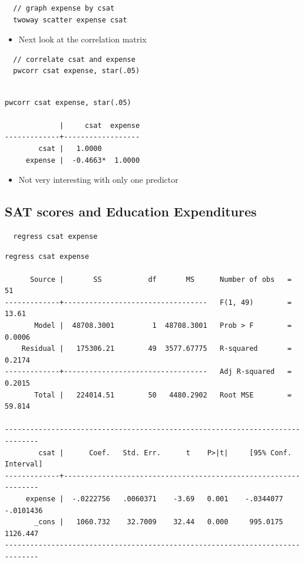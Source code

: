 \documentclass[]{book}
\providecommand{\tightlist}{%
  \setlength{\itemsep}{0pt}\setlength{\parskip}{0pt}}
\begin{document}
\begin{verbatim}
  // graph expense by csat
  twoway scatter expense csat
\end{verbatim}

\begin{itemize}
\tightlist
\item
  Next look at the correlation matrix
\end{itemize}

\begin{verbatim}
  // correlate csat and expense
  pwcorr csat expense, star(.05)
\end{verbatim}

\begin{verbatim}

pwcorr csat expense, star(.05)

             |     csat  expense
-------------+------------------
        csat |   1.0000 
     expense |  -0.4663*  1.0000
\end{verbatim}

\begin{itemize}
\tightlist
\item
  Not very interesting with only one predictor
\end{itemize}

\subsection{SAT scores and Education
Expenditures}\label{sat-scores-and-education-expenditures}

\begin{verbatim}
  regress csat expense
\end{verbatim}

\begin{verbatim}
regress csat expense

      Source |       SS           df       MS      Number of obs   =        51
-------------+----------------------------------   F(1, 49)        =     13.61
       Model |  48708.3001         1  48708.3001   Prob > F        =    0.0006
    Residual |   175306.21        49  3577.67775   R-squared       =    0.2174
-------------+----------------------------------   Adj R-squared   =    0.2015
       Total |   224014.51        50   4480.2902   Root MSE        =    59.814

------------------------------------------------------------------------------
        csat |      Coef.   Std. Err.      t    P>|t|     [95% Conf. Interval]
-------------+----------------------------------------------------------------
     expense |  -.0222756   .0060371    -3.69   0.001    -.0344077   -.0101436
       _cons |   1060.732    32.7009    32.44   0.000     995.0175    1126.447
------------------------------------------------------------------------------
\end{verbatim}
\end{document}
